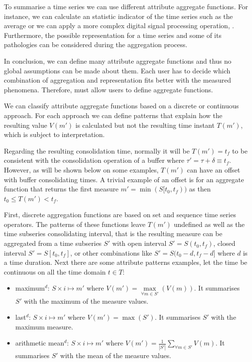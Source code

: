 To summarise a time series we can use different attribute aggregate
functions.  For instance, we can calculate an statistic indicator of
the time series such as the average or we can apply a more complex
digital signal processing operation, \cite{zhang11}. Furthermore, the
possible representation for a time series and some of its pathologies
can be considered during the aggregation process.


In conclusion, we can define many attribute aggregate functions and
thus no global assumptions can be made about them. Each user has to
decide which combination of aggregation and representation fits better
with the measured phenomena.  Therefore,  must allow users to
define aggregate functions.

We can classify attribute aggregate functions based on a discrete or
continuous approach. For each approach we can define patterns that
explain how the resulting value $V(m')$ is calculated but not the
resulting time instant $T(m')$, which is subject to
interpretation.  


Regarding the resulting consolidation time, normally it will be
$T(m')=t_f$ to be consistent with the consolidation operation of a
buffer where $\tau' = \tau + \delta \equiv t_f$. However, as will be
shown below on some examples, $T(m')$ can have an offset with buffer
consolidating times. A trivial example of an offset is for an
aggregate function that returns the first measure
$m'=\min(S[t_0,t_f))$ as then $t_0 \leq T(m') < t_f$.


First, discrete aggregation functions are based on set and sequence
time series operators. The patterns of these functions leave $T(m')$
undefined as well as the time subseries consolidating interval, that
is the resulting measure can be aggregated from a time subseries $S'$
with open interval $S'=S(t_0,t_f)$, closed interval $S'=S[t_0,t_f]$,
or other combinations like $S'=S(t_0-d,t_f-d]$ where $d$ is a time
duration. Next there are some attribute patterns examples, let the
time be continuous on all the time domain $t\in T$:
\begin{itemize}
\item maximum$^d$: $S \times i \mapsto m'$ where $V(m') =
  \max\limits_{\forall m \in S'}(V(m))$. It summarises $S'$ with the maximum
  of the measure values.
\item last$^d$: $S \times i \mapsto m'$ where $V(m') = \max(S')$. It
  summarises $S'$ with the maximum measure.
\item arithmetic mean$^d$: $S \times i \mapsto m'$ where $V(m') = 
  \frac{1}{|S'|} \allowbreak \sum\limits_{\forall m\in S'} V(m)$. It
  summarises $S'$ with the mean of the measure values.
\end{itemize}


